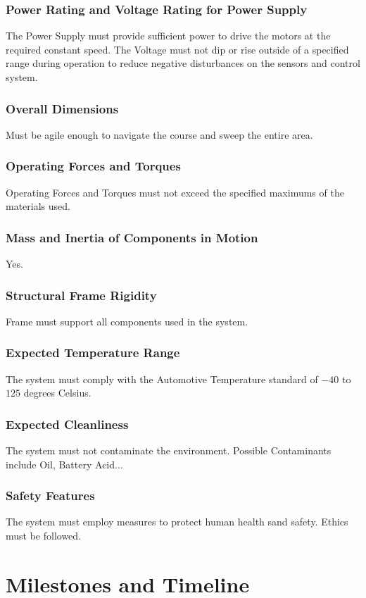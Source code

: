 \documentclass[12pt]{article}
\begin{document}
\subsubsection{Power Rating and Voltage Rating for Power Supply}
The Power Supply must provide sufficient power to drive the motors at the required constant speed. The Voltage must not dip or rise outside of a specified range during operation to reduce negative disturbances on the sensors and control system.
\subsubsection{Overall Dimensions}
Must be agile enough to navigate the course and sweep the entire area.
\subsubsection{Operating Forces and Torques}
Operating Forces and Torques must not exceed the specified maximums of the materials used.
\subsubsection{Mass and Inertia of Components in Motion}
Yes.
\subsubsection{Structural Frame Rigidity}
Frame must support all components used in the system.
\subsubsection{Expected Temperature Range}
The system must comply with the Automotive Temperature standard of $-40$ to $125$ degrees Celsius.
\subsubsection{Expected Cleanliness}
The system must not contaminate the environment. Possible Contaminants include Oil, Battery Acid...
\subsubsection{Safety Features}
The system must employ measures to protect human health sand safety. Ethics must be followed. 

\section{Milestones and Timeline}
\end{document}
